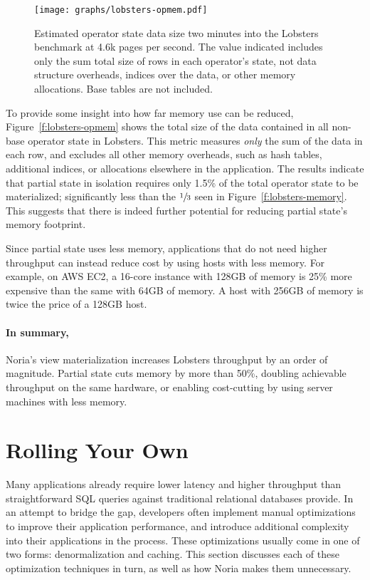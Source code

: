 \begin{figure}[h]
  \centering
  \texttt{[image: graphs/lobsters-opmem.pdf]}
  \caption{Estimated operator state data size two minutes into the Lobsters
  benchmark at 4.6k pages per second. The value indicated includes only the sum
  total size of rows in each operator's state, not data structure overheads,
  indices over the data, or other memory allocations. Base tables are not
  included.}
  \label{f:lobsters-opmem}
\end{figure}

To provide some insight into how far memory use can be reduced,
Figure~\vref{f:lobsters-opmem} shows the total size of the data contained in all
non-base operator state in Lobsters. This metric measures \emph{only} the sum of
the data in each row, and excludes all other memory overheads, such as hash
tables, additional indices, or allocations elsewhere in the application. The
results indicate that partial state in isolation requires only 1.5\% of the
total operator state to be materialized; significantly less than the
$\sfrac{1}{3}$ seen in Figure~\ref{f:lobsters-memory}. This suggests that there
is indeed further potential for reducing partial state's memory footprint.

Since partial state uses less memory, applications that do not need higher
throughput can instead reduce cost by using hosts with less memory. For example,
on AWS EC2, a 16-core instance with 128GB of memory is 25\% more expensive than
the same with 64GB of memory. A host with 256GB of memory is twice the price of
a 128GB host.

\paragraph{In summary,} Noria's view materialization increases Lobsters
throughput by an order of magnitude. Partial state cuts memory by more than
50\%, doubling achievable throughput on the same hardware, or enabling
cost-cutting by using server machines with less memory.

\section{Rolling Your Own}
\label{s:eval:alts}

Many applications already require lower latency and higher throughput than
straightforward SQL queries against traditional relational databases provide.
In an attempt to bridge the gap, developers often implement manual optimizations
to improve their application performance, and introduce additional complexity
into their applications in the process. These optimizations usually come in one
of two forms: denormalization and caching. This section discusses each of these
optimization techniques in turn, as well as how Noria makes them unnecessary.

